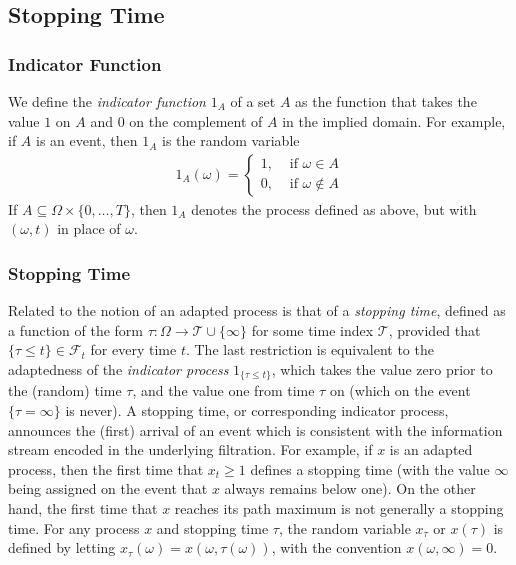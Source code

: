 \documentclass[\topdir/lecture\_notes.tex]{subfiles}
\begin{document}
\begin{optional}
\subsection{Stopping Time}
\subsubsection{Indicator Function}
We define the \emph{indicator function} \(1_{A}\) of a set \(A\) as the function that takes the value \(1\) on \(A\) and \(0\) on the complement of \(A\) in the implied domain. For example, if \(A\) is an event, then \(1_{A}\) is the random variable
\begin{align*}
1_{A}(\omega)= \begin{cases}1, & \text { if } \omega \in A \\ 0, & \text { if } \omega \notin A\end{cases}
\end{align*}
If \(A \subseteq \Omega \times\{0, \ldots, T\}\), then \(1_{A}\) denotes the process defined as above, but with \((\omega, t)\) in place of \(\omega\).
\subsubsection{Stopping Time}
Related to the notion of an adapted process is that of a \emph{stopping time}, defined as a function of the form \(\tau: \Omega \to \mathcal{T} \cup\{\infty\}\) for some time index \(\mathcal{T}\), provided that \(\{\tau \leq t\} \in \mathcal{F}_{t}\) for every time \(t\). The last restriction is equivalent to the adaptedness of the \emph{indicator process} \(1_{\{\tau \leq t\}}\), which takes the value zero prior to the (random) time \(\tau\), and the value one from time \(\tau\) on (which on the event \(\{\tau=\infty\}\) is never). A stopping time, or corresponding indicator process, announces the (first) arrival of an event which is consistent with the information stream encoded in the underlying filtration. For example, if \(x\) is an adapted process, then the first time that \(x_{t} \geq 1\) defines a stopping time (with the value \(\infty\) being assigned on the event that \(x\) always remains below one). On the other hand, the first time that \(x\) reaches its path maximum is not generally a stopping time. For any process \(x\) and stopping time \(\tau\), the random variable \(x_{\tau}\) or \(x(\tau)\) is defined by letting \(x_{\tau}(\omega)=x(\omega, \tau(\omega))\), with the convention \(x(\omega, \infty)=0\).
\end{optional}
\end{document}
